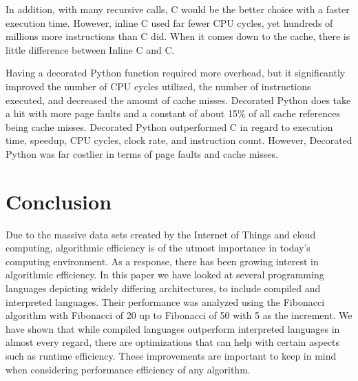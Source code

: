 \documentclass{sig-alternate}
\begin{document}
In addition, with many recursive calls, C would be the better choice with a faster execution time. However, inline C used far fewer CPU cycles, yet hundreds of millions more instructions than C did. When it comes down to the cache, there is little difference between Inline C and C.

Having a decorated Python function required more overhead, but it significantly improved the number of CPU cycles utilized, the number of instructions executed, and decreased the amount of cache misses. Decorated Python does take a hit with more page faults and a constant of about 15\% of all cache references being cache misses. Decorated Python outperformed C in regard to execution time, speedup, CPU cycles, clock rate, and instruction count. However, Decorated Python was far costlier in terms of page faults and cache misses.

\section{Conclusion}

Due to the massive data sets created by the Internet of Things and cloud computing, algorithmic efficiency is of the utmost importance in today's computing environment. As a response, there has been growing interest in algorithmic efficiency. In this paper we have looked at several programming languages depicting widely differing architectures, to include compiled and interpreted languages. Their performance was analyzed using the Fibonacci algorithm with Fibonacci of 20 up to Fibonacci of 50 with 5 as the increment. We have shown that while compiled languages outperform interpreted languages in almost every regard, there are optimizations that can help with certain aspects such as runtime efficiency. These improvements are important to keep in mind when considering performance efficiency of any algorithm.







\end{document}
